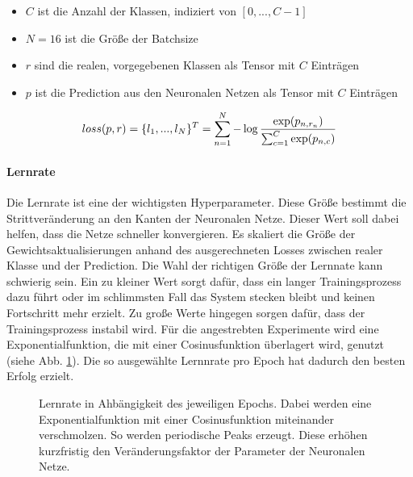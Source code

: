 \vspace{-0.2cm}

\begin{itemize}
  \setlength\itemsep{-0.5em}
\item $C$ ist die Anzahl der Klassen, indiziert von $[0, ..., C-1]$
\item $N = 16$ ist die Größe der Batchsize
\item $r$ sind die realen, vorgegebenen Klassen als Tensor mit $C$ Einträgen
\item $p$ ist die Prediction aus den Neuronalen Netzen als Tensor mit $C$ Einträgen
\end{itemize}

\vspace{-0.5cm}

\begin{equation}\centering
loss(p, r) = \{l_1, ... ,l_N\}^T = \sum_{n=1}^N {- \log \frac{\exp(p_{n,r_n})}{\sum_{c=1}^C \exp(p_{n,c})}}
\label{eq:loss}
\end{equation}


\paragraph{Lernrate} Die Lernrate ist eine der wichtigsten Hyperparameter. Diese Größe bestimmt die Strittveränderung an den Kanten der Neuronalen Netze. Dieser Wert soll dabei helfen, dass die Netze schneller konvergieren. Es skaliert die Größe der Gewichtsaktualisierungen anhand des ausgerechneten Losses zwischen realer Klasse und der Prediction. Die Wahl der richtigen Größe der Lernnate kann schwierig sein. Ein zu kleiner Wert sorgt dafür, dass ein langer Trainingsprozess dazu führt oder im schlimmsten Fall das System stecken bleibt und keinen Fortschritt mehr erzielt. Zu große Werte hingegen sorgen dafür, dass der Trainingsprozess instabil wird. Für die angestrebten Experimente wird eine Exponentialfunktion, die mit einer Cosinusfunktion überlagert wird, genutzt (siehe Abb. \ref{cap:lrrate}). Die so ausgewählte Lernnrate pro Epoch hat dadurch den besten Erfolg erzielt.

\vspace{-1cm}

\begin{figure}[!h]\centering
\makebox[0pt]{}
\caption[Lernrate in Ahbängigkeit des jeweiligen Epochs]{Lernrate in Ahbängigkeit des jeweiligen Epochs. Dabei werden eine Exponentialfunktion mit einer Cosinusfunktion miteinander verschmolzen. So werden periodische Peaks erzeugt. Diese erhöhen kurzfristig den Veränderungsfaktor der Parameter der Neuronalen Netze.}\label{cap:lrrate}
\end{figure}\label{fig:lrrate}













